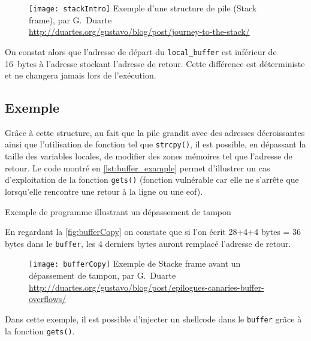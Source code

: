 \begin{figure}[H]
	\centering
	\texttt{[image: stackIntro]}
	{Exemple d'une structure de pile (Stack frame), par G.~Duarte}
	{\url{http://duartes.org/gustavo/blog/post/journey-to-the-stack/}}
	\label{fig:stackIntro}
\end{figure}

On constat alors que l'adresse de départ du \texttt{local_buffer} est inférieur de 16~bytes à l'adresse stockant l'adresse de retour. Cette différence est déterministe et ne changera jamais lors de l'exécution.

\vfill

\subsection{Exemple}

Grâce à cette structure, au fait que la pile grandit avec des adresses décroissantes ainsi que l'utilisation de fonction tel que \texttt{strcpy()}, il est possible, en dépassant la taille des variables locales, de modifier des zones mémoires tel que l'adresse de retour. Le code montré en \autoref{lst:buffer_example} permet d'illustrer un cas d'exploitation de la fonction \texttt{gets()} (fonction vulnérable car elle ne s'arrête que lorsqu'elle rencontre une retour à la ligne ou une \gls{eof}).

\begin{listing}
	\caption{Exemple de programme illustrant un dépassement de tampon}
	\label{lst:buffer_example}
\end{listing}

En regardant la \autoref{fig:bufferCopy} on constate que si l'on écrit 28+4+4 bytes = 36 bytes dans le \texttt{buffer}, les 4 derniers bytes auront remplacé l'adresse de retour.

\begin{figure}[H]
	\centering
	\texttt{[image: bufferCopy]}
	{Exemple de Stacke frame avant un dépassement de tampon, par G.~Duarte}
	{\url{http://duartes.org/gustavo/blog/post/epilogues-canaries-buffer-overflows/}}
	\label{fig:bufferCopy}
\end{figure}

Dans cette exemple, il est possible d'injecter un shellcode dans le \texttt{buffer} grâce à la fonction \texttt{gets()}.

